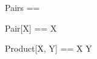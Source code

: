 \documentclass[a4paper,10pt,fleqn]{article}
\begin{document}
\begin{zed}
Pairs == \nat \cross \nat
\end{zed}

\begin{zed}
Pair[X] == X
\end{zed}

\begin{zed}
Product[X, Y] == X \cross Y
\end{zed}
\end{document}
